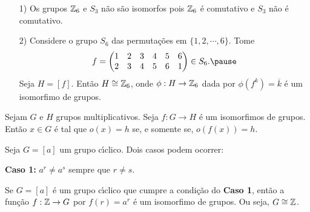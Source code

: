 \documentclass{beamer}
\begin{document}
    \begin{frame}
        \begin{exemplos}
            \vspace{.3cm}
            \begin{enumerate}
                \item[1)] Os grupos $\mathbb{Z}_6$ e $S_3$ \pause não são isomorfos \pause pois $\mathbb{Z}_6$ é comutativo \pause e $S_3$ não é comutativo.\pause

                \vspace{.3cm}

                \item[2)] Considere o grupo $S_6$ das permutaç\~oes em $\{1, 2, \cdots, 6\}$. \pause Tome
                \[
                    f = \begin{pmatrix}
                        1 & 2 & 3 & 4 & 5 & 6\\
                        2 & 3 & 4 & 5 & 6 & 1
                    \end{pmatrix} \in S_6. \pause
                \]
                Seja $H = [f]$. \pause Então $H \cong \mathbb{Z}_6$, \pause onde $\phi : H \to \mathbb{Z}_6$ dada por $\phi(f^k) = \overline{k}$ \pause é um isomorfimo de grupos.

                \vspace{.3cm}

            \end{enumerate}
        \end{exemplos}
    \end{frame}

    \begin{frame}
        \begin{proposicao}
            Sejam $G$ e $H$ grupos multiplicativos. \pause Seja $f : G \to H$ é um isomorfimos de grupos. \pause Então $x \in G$ \pause é tal que $o(x) = h$ \pause se, e somente se, $o(f(x)) = h$.
        \end{proposicao}
    \end{frame}

    \begin{frame}
        Seja $G = [a]$ um grupo c{\'\i}clico. \pause Dois casos podem ocorrer: \pause

        \textbf{Caso 1:} $a^r \ne a^s$ \pause sempre que $r \ne s$.
    \end{frame}

    \begin{frame}
        \begin{proposicao}
            Se $G = [a]$ é um grupo c{\'\i}clico que cumpre a condição do \textbf{Caso 1}, \pause então a função $f : \mathbb{Z} \to G$ por $f(r) = a^r$ \pause é um isomorfimo de grupos. \pause Ou seja, $G \cong \mathbb{Z}$.
        \end{proposicao}
    \end{frame}
\end{document}

